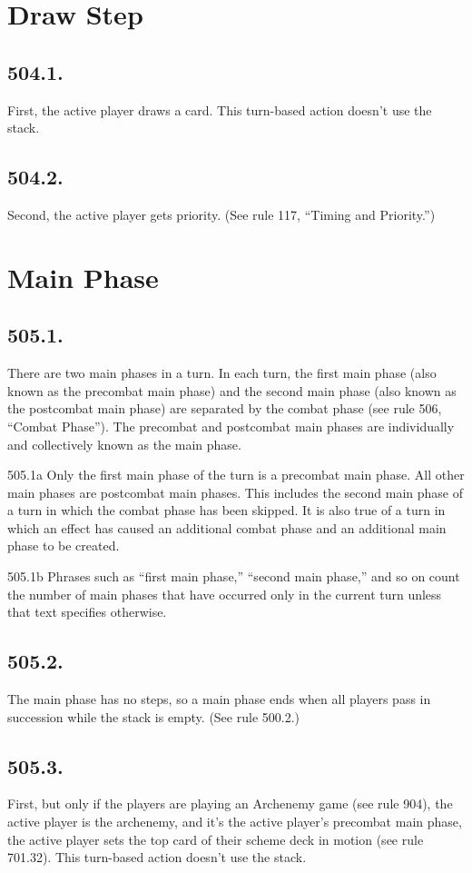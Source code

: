 \section{Draw Step}
\subsection*{504.1.}
First, the active player draws a card. This turn-based action doesn’t use the stack.

\subsection*{504.2.}
Second, the active player gets priority. (See rule 117, “Timing and Priority.”)

\section{Main Phase}
\subsection*{505.1.}
There are two main phases in a turn. In each turn, the first main phase (also known as the precombat main phase) and the second main phase (also known as the postcombat main phase) are separated by the combat phase (see rule 506, “Combat Phase”). The precombat and postcombat main phases are individually and collectively known as the main phase.

505.1a Only the first main phase of the turn is a precombat main phase. All other main phases are postcombat main phases. This includes the second main phase of a turn in which the combat phase has been skipped. It is also true of a turn in which an effect has caused an additional combat phase and an additional main phase to be created.

505.1b Phrases such as “first main phase,” “second main phase,” and so on count the number of main phases that have occurred only in the current turn unless that text specifies otherwise.

\subsection*{505.2.}
The main phase has no steps, so a main phase ends when all players pass in succession while the stack is empty. (See rule 500.2.)

\subsection*{505.3.}
First, but only if the players are playing an Archenemy game (see rule 904), the active player is the archenemy, and it’s the active player’s precombat main phase, the active player sets the top card of their scheme deck in motion (see rule 701.32). This turn-based action doesn’t use the stack.


